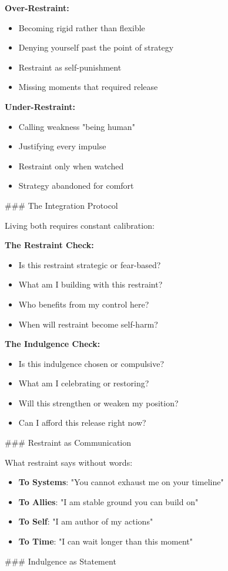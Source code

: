 \documentclass[12pt]{book}
\begin{document}
\textbf{Over-Restraint:}
\begin{itemize}
\item Becoming rigid rather than flexible
\item Denying yourself past the point of strategy
\item Restraint as self-punishment
\item Missing moments that required release

\end{itemize}
\textbf{Under-Restraint:}
\begin{itemize}
\item Calling weakness "being human"
\item Justifying every impulse
\item Restraint only when watched
\item Strategy abandoned for comfort

\end{itemize}
\#\#\# The Integration Protocol

Living both requires constant calibration:

\textbf{The Restraint Check:}
\begin{itemize}
\item Is this restraint strategic or fear-based?
\item What am I building with this restraint?
\item Who benefits from my control here?
\item When will restraint become self-harm?

\end{itemize}
\textbf{The Indulgence Check:}
\begin{itemize}
\item Is this indulgence chosen or compulsive?
\item What am I celebrating or restoring?
\item Will this strengthen or weaken my position?
\item Can I afford this release right now?

\end{itemize}
\#\#\# Restraint as Communication

What restraint says without words:

\begin{itemize}
\item \textbf{To Systems}: "You cannot exhaust me on your timeline"
\item \textbf{To Allies}: "I am stable ground you can build on"
\item \textbf{To Self}: "I am author of my actions"
\item \textbf{To Time}: "I can wait longer than this moment"

\end{itemize}
\#\#\# Indulgence as Statement
\end{document}
